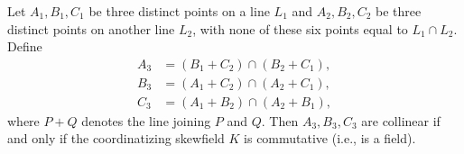Let $A_1, B_1, C_1$ be three distinct points on a line $L_1$ and $A_2, B_2, C_2$ be three distinct points on another line $L_2$, with none of these six points equal to $L_1 \cap L_2$. Define
\begin{align*}
A_3 &= (B_1 + C_2) \cap (B_2 + C_1),\\
B_3 &= (A_1 + C_2) \cap (A_2 + C_1),\\
C_3 &= (A_1 + B_2) \cap (A_2 + B_1),
\end{align*}
where $P+Q$ denotes the line joining $P$ and $Q$. Then $A_3, B_3, C_3$ are collinear if and only if the coordinatizing skewfield $K$ is commutative (i.e., is a field).
